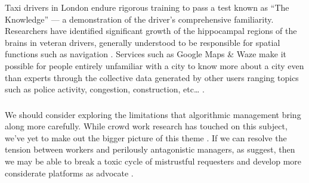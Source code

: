 \documentclass[trackingWork]{subfiles}
\begin{document}
Taxi drivers in London endure rigorous training to pass a test known as ``The Knowledge''
--- a demonstration of the driver's comprehensive familiarity.
Researchers have identified significant growth of
the hippocampal regions of the brains in veteran drivers,
generally understood to be responsible for spatial functions such as navigation
\cite{Maguire11042000,Maguire2894,Skok:1999:KML:299513.299625,
      skok2000managing,Woollett1407,woollett2011acquiring}.
Services such as Google Maps \& Waze make it possible for
people entirely unfamiliar with a city
to know more about a city even than experts through
the collective data generated by other users
ranging topics such as police activity, congestion, construction, etc\dots
\cite{silva2013traffic,hind2014outsmarting}.

\subsubsection{\implication}

We should consider exploring the limitations that algorithmic management bring along more carefully.
While crowd work research has touched on this subject, we've yet to make out the bigger picture of this theme
\cite{uberAlgorithm}.
If we can resolve the tension between workers and perilously antagonistic managers, as \citeauthor{10.2307/2118435} suggest,
then we may be able to break a toxic cycle of mistrustful requesters \cite[for example][]{MaliciousCrowdworkersGadiraju}
and develop more considerate platforms as \citeauthor{takingAHITMcInnis} advocate
\cite{takingAHITMcInnis}.
\end{document}
